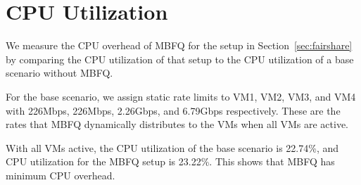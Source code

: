 \section{CPU Utilization}
\label{sec:utilization}

We measure the CPU overhead of MBFQ for the setup in Section~\ref{sec:fairshare}
by comparing the CPU utilization of that setup to the CPU utilization of a base scenario
without MBFQ.  

For the base scenario, we assign static rate limits to VM1, VM2, VM3, and VM4 with 
226Mbps, 226Mbps, 2.26Gbps, 
and 6.79Gbps respectively.  These are the rates that MBFQ dynamically distributes  to
the VMs when all VMs are active.

With all VMs active, the CPU utilization of the base scenario is 22.74\%, and CPU utilization
for the MBFQ setup is 23.22\%. This shows that MBFQ has minimum CPU overhead.

